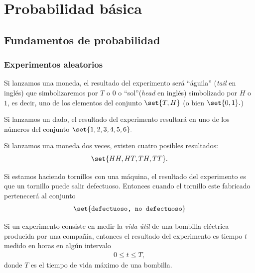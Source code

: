 \chapter{Probabilidad básica}


\section{Fundamentos de probabilidad}

\subsection{Experimentos aleatorios}

 \begin{ejemplo}
  \label{exmp:1.1}
  Si lanzamos una moneda, el resultado del experimento será ``águila'' (\emph{tail} en inglés) que simbolizaremos por $T$ o $0$ o ``sol''(\emph{head} en inglés) simbolizado por $H$ o $1$, es decir, uno de los elementos del conjunto $\set{T,H}$ (o bien $\set{0,1}.$)
 \end{ejemplo}



 \begin{ejemplo}
  \label{exmp:1.2}
  Si lanzamos un dado, el resultado del experimento resultará en uno de los números del conjunto $\set{1,2,3,4,5,6}.$
 \end{ejemplo}



 \begin{ejemplo}
  \label{exmp:1.3}
  Si lanzamos una moneda dos veces, existen cuatro posibles resultados:
  \begin{align*}
   \set{HH,HT,TH,TT}.
  \end{align*}

 \end{ejemplo}



 \begin{ejemplo}
  \label{exmp:1.4}
  Si estamos haciendo tornillos con una máquina, el resultado del experimento es que un tornillo puede salir defectuoso. Entonces cuando el tornillo este fabricado pertenecerá al conjunto
  \begin{align*}
   \set{\texttt{defectuoso, no defectuoso}}
  \end{align*}

 \end{ejemplo}



 \begin{ejemplo}
  \label{exmp:1.5}
  Si un experimento consiste en medir la \emph{vida útil} de una bombilla eléctrica producida por una compa\~nía, entonces el resultado del experimento es tiempo $t$ medido en horas en algún intervalo
  \begin{align*}
   0\leq t \leq T,
  \end{align*}
donde $T$ es el tiempo de vida máximo de una bombilla.
 \end{ejemplo}



